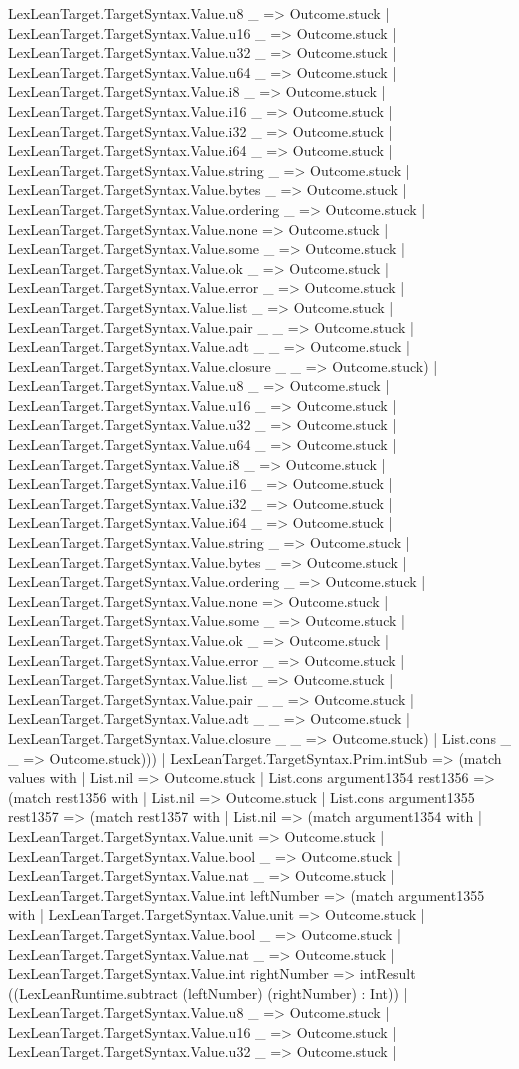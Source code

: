 \documentclass[11pt]{article}
\begin{document}
LexLeanTarget.TargetSyntax.Value.u8 \_ => Outcome.stuck | LexLeanTarget.TargetSyntax.Value.u16 \_ => Outcome.stuck | LexLeanTarget.TargetSyntax.Value.u32 \_ => Outcome.stuck | LexLeanTarget.TargetSyntax.Value.u64 \_ => Outcome.stuck | LexLeanTarget.TargetSyntax.Value.i8 \_ => Outcome.stuck | LexLeanTarget.TargetSyntax.Value.i16 \_ => Outcome.stuck | LexLeanTarget.TargetSyntax.Value.i32 \_ => Outcome.stuck | LexLeanTarget.TargetSyntax.Value.i64 \_ => Outcome.stuck | LexLeanTarget.TargetSyntax.Value.string \_ => Outcome.stuck | LexLeanTarget.TargetSyntax.Value.bytes \_ => Outcome.stuck | LexLeanTarget.TargetSyntax.Value.ordering \_ => Outcome.stuck | LexLeanTarget.TargetSyntax.Value.none => Outcome.stuck | LexLeanTarget.TargetSyntax.Value.some \_ => Outcome.stuck | LexLeanTarget.TargetSyntax.Value.ok \_ => Outcome.stuck | LexLeanTarget.TargetSyntax.Value.error \_ => Outcome.stuck | LexLeanTarget.TargetSyntax.Value.list \_ => Outcome.stuck | LexLeanTarget.TargetSyntax.Value.pair \_ \_ => Outcome.stuck | LexLeanTarget.TargetSyntax.Value.adt \_ \_ => Outcome.stuck | LexLeanTarget.TargetSyntax.Value.closure \_ \_ => Outcome.stuck) | LexLeanTarget.TargetSyntax.Value.u8 \_ => Outcome.stuck | LexLeanTarget.TargetSyntax.Value.u16 \_ => Outcome.stuck | LexLeanTarget.TargetSyntax.Value.u32 \_ => Outcome.stuck | LexLeanTarget.TargetSyntax.Value.u64 \_ => Outcome.stuck | LexLeanTarget.TargetSyntax.Value.i8 \_ => Outcome.stuck | LexLeanTarget.TargetSyntax.Value.i16 \_ => Outcome.stuck | LexLeanTarget.TargetSyntax.Value.i32 \_ => Outcome.stuck | LexLeanTarget.TargetSyntax.Value.i64 \_ => Outcome.stuck | LexLeanTarget.TargetSyntax.Value.string \_ => Outcome.stuck | LexLeanTarget.TargetSyntax.Value.bytes \_ => Outcome.stuck | LexLeanTarget.TargetSyntax.Value.ordering \_ => Outcome.stuck | LexLeanTarget.TargetSyntax.Value.none => Outcome.stuck | LexLeanTarget.TargetSyntax.Value.some \_ => Outcome.stuck | LexLeanTarget.TargetSyntax.Value.ok \_ => Outcome.stuck | LexLeanTarget.TargetSyntax.Value.error \_ => Outcome.stuck | LexLeanTarget.TargetSyntax.Value.list \_ => Outcome.stuck | LexLeanTarget.TargetSyntax.Value.pair \_ \_ => Outcome.stuck | LexLeanTarget.TargetSyntax.Value.adt \_ \_ => Outcome.stuck | LexLeanTarget.TargetSyntax.Value.closure \_ \_ => Outcome.stuck) | List.cons \_ \_ => Outcome.stuck))) | LexLeanTarget.TargetSyntax.Prim.intSub => (match values with | List.nil => Outcome.stuck | List.cons argument1354 rest1356 => (match rest1356 with | List.nil => Outcome.stuck | List.cons argument1355 rest1357 => (match rest1357 with | List.nil => (match argument1354 with | LexLeanTarget.TargetSyntax.Value.unit => Outcome.stuck | LexLeanTarget.TargetSyntax.Value.bool \_ => Outcome.stuck | LexLeanTarget.TargetSyntax.Value.nat \_ => Outcome.stuck | LexLeanTarget.TargetSyntax.Value.int leftNumber => (match argument1355 with | LexLeanTarget.TargetSyntax.Value.unit => Outcome.stuck | LexLeanTarget.TargetSyntax.Value.bool \_ => Outcome.stuck | LexLeanTarget.TargetSyntax.Value.nat \_ => Outcome.stuck | LexLeanTarget.TargetSyntax.Value.int rightNumber => intResult ((LexLeanRuntime.subtract (leftNumber) (rightNumber) : Int)) | LexLeanTarget.TargetSyntax.Value.u8 \_ => Outcome.stuck | LexLeanTarget.TargetSyntax.Value.u16 \_ => Outcome.stuck | LexLeanTarget.TargetSyntax.Value.u32 \_ => Outcome.stuck | 
\end{document}
